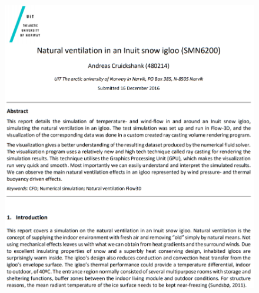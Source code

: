 \documentclass[a4paper,11pt]{extarticle}
\begin{document}
\begin{appendices}
\begin{figure}[H]
  \centering
  \includegraphics[width=\textwidth]{ProjectExample.png}
\end{figure}

\end{appendices}
\end{document}
